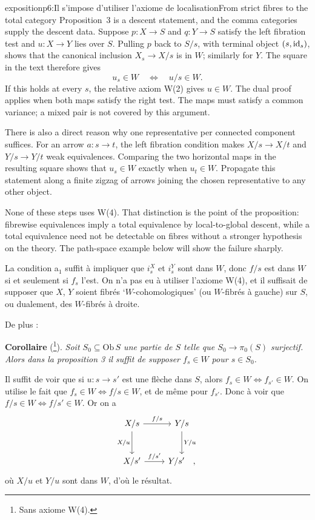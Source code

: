 \begin{dcomment}{exposition}{p6:Il s'impose d'utiliser l'axiome de localisation}{From strict fibres to the total category}
Proposition~3 is a descent statement, and the comma categories supply the descent data. Suppose \(p:X\to S\) and \(q:Y\to S\) satisfy the left fibration test and \(u:X\to Y\) lies over \(S\). Pulling \(p\) back to \(S/s\), with terminal object \((s,\mathrm{id}_s)\), shows that the canonical inclusion \(X_s\to X/s\) is in \(W\); similarly for \(Y\). The square in the text therefore gives
\[
 u_s\in W\quad\Longleftrightarrow\quad u/s\in W .
\]
If this holds at every \(s\), the relative axiom W(2) gives \(u\in W\). The dual proof applies when both maps satisfy the right test. The maps must satisfy a common variance; a mixed pair is not covered by this argument.

There is also a direct reason why one representative per connected component suffices. For an arrow \(a:s\to t\), the left fibration condition makes \(X/s\to X/t\) and \(Y/s\to Y/t\) weak equivalences. Comparing the two horizontal maps in the resulting square shows that \(u_s\in W\) exactly when \(u_t\in W\). Propagate this statement along a finite zigzag of arrows joining the chosen representative to any other object.

None of these steps uses W(4). That distinction is the point of the proposition: fibrewise equivalences imply a total equivalence by local-to-global descent, while a total equivalence need not be detectable on fibres without a stronger hypothesis on the theory. The path-space example below will show the failure sharply.
\end{dcomment}


La condition a$_1$ suffit à impliquer que $i_s^X$ et $i_s^Y$ sont dans $W$, donc $f/s$ est dans $W$ si et seulement si $f_s$ l'est. On n'a pas eu à utiliser l'axiome W(4), et il suffisait de supposer que $X$, $Y$ soient fibrés ‘$W$-cohomologiques’ (ou $W$-fibrés à gauche) sur $S$, ou dualement, des $W$-fibrés à droite.

De plus :

\textbf{Corollaire} (\footnote[9]{Sans axiome W(4).}). \textit{Soit $S_0 \subseteq \mathrm{Ob}\,S$ une partie de $S$ telle que $S_0 \longrightarrow \pi_0(S)$ surjectif. Alors dans la proposition 3 il suffit de supposer $f_s \in W$ pour $s \in S_0$.}

Il suffit de voir que si $u : s \longrightarrow s'$ est une flèche dans $S$, alors $f_s \in W \iff f_{s'} \in W$. On utilise le fait que $f_s \in W \iff f/s \in W$, et de même pour $f_{s'}$. Donc à voir que $f/s \in W \iff f/s' \in W$. Or on a
\[
\begin{tikzcd}[row sep=large]
X/s \arrow[r, "f/s"] \arrow[d, "X/u"'] & Y/s \arrow[d, "Y/u"] \\
X/s' \arrow[r, "f/s'"] & Y/s' \quad ,
\end{tikzcd}
\]
où $X/u$ et $Y/u$ sont dans $W$, d'où le résultat.

